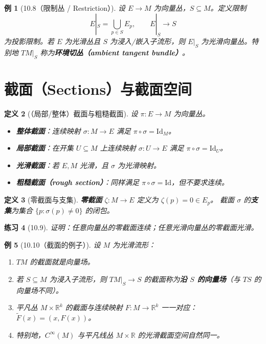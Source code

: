 \documentclass[12pt]{article}
\newtheorem{definition}{定义}[section]
\newtheorem{example}[definition]{例}
\newtheorem{exercise}[definition]{练习}
\begin{document}
\begin{example}[10.8（限制丛 / Restriction）]
设 $E\to M$ 为向量丛，$S\subseteq M$。定义限制
\[
E|_S=\bigcup_{p\in S}E_p,\qquad E|_S\to S
\]
为投影限制。若 $E$ 为光滑丛且 $S$ 为浸入/嵌入子流形，则 $E|_S$ 为光滑向量丛。特别地 $TM|_S$ 称为\textbf{环境切丛（ambient tangent bundle）}。
\end{example}

\section{截面（Sections）与截面空间}

\begin{definition}[（局部/整体）截面与粗糙截面]
设 $\pi:E\to M$ 为向量丛。
\begin{itemize}
\item \textbf{整体截面}：连续映射 $\sigma:M\to E$ 满足 $\pi\circ\sigma=\mathrm{Id}_M$。
\item \textbf{局部截面}：在开集 $U\subseteq M$ 上连续映射 $\sigma:U\to E$ 满足 $\pi\circ\sigma=\mathrm{Id}_U$。
\item \textbf{光滑截面}：若 $E,M$ 光滑，且 $\sigma$ 为光滑映射。
\item \textbf{粗糙截面（rough section）}：同样满足 $\pi\circ\sigma=\mathrm{Id}$，但不要求连续。
\end{itemize}
\end{definition}

\begin{definition}[零截面与支集]
\textbf{零截面} $\zeta:M\to E$ 定义为 $\zeta(p)=0\in E_p$。
截面 $\sigma$ 的\textbf{支集}为集合 $\{p:\sigma(p)\neq 0\}$ 的闭包。
\end{definition}

\begin{exercise}[10.9]
证明：任意向量丛的零截面连续；任意光滑向量丛的零截面光滑。
\end{exercise}

\begin{example}[10.10（截面的例子）]
设 $M$ 为光滑流形：
\begin{enumerate}[label=(\alph*)]
\item $TM$ 的截面就是向量场。
\item 若 $S\subseteq M$ 为浸入子流形，则 $TM|_S\to S$ 的截面称为\textbf{沿 $S$ 的向量场}（与 $TS$ 的向量场不同）。
\item 平凡丛 $M\times\mathbb{R}^k$ 的截面与连续映射 $F:M\to\mathbb{R}^k$ 一一对应：$\tilde F(x)=(x,F(x))$。
\item 特别地，$C^\infty(M)$ 与平凡线丛 $M\times\mathbb{R}$ 的光滑截面空间自然同一。
\end{enumerate}
\end{example}
\end{document}
